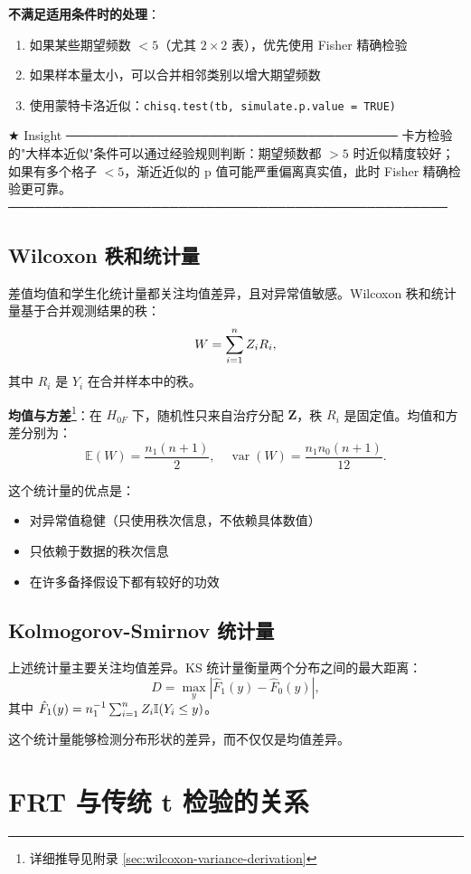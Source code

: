 \textbf{不满足适用条件时的处理}：

\begin{enumerate}
  \item 如果某些期望频数 $< 5$（尤其 $2 \times 2$ 表），优先使用 Fisher 精确检验
  \item 如果样本量太小，可以合并相邻类别以增大期望频数
  \item 使用蒙特卡洛近似：\texttt{chisq.test(tb, simulate.p.value = TRUE)}
\end{enumerate}

★ Insight ─────────────────────────────────────
卡方检验的"大样本近似"条件可以通过经验规则判断：期望频数都 $>5$ 时近似精度较好；如果有多个格子 $<5$，渐近近似的 p 值可能严重偏离真实值，此时 Fisher 精确检验更可靠。
─────────────────────────────────────────────────

\subsection{Wilcoxon 秩和统计量}

差值均值和学生化统计量都关注均值差异，且对异常值敏感。Wilcoxon 秩和统计量基于合并观测结果的秩：
\[
W = \sum_{i=1}^n Z_i R_i,
\]
其中 $R_i$ 是 $Y_i$ 在合并样本中的秩。

\textbf{均值与方差}\footnote{详细推导见附录 \cref{sec:wilcoxon-variance-derivation}}：在 $H_{0F}$ 下，随机性只来自治疗分配 $\mathbf{Z}$，秩 $R_i$ 是固定值。均值和方差分别为：
\[
\mathbb{E}(W) = \frac{n_1(n+1)}{2}, \quad \operatorname{var}(W) = \frac{n_1 n_0 (n+1)}{12}.
\]

这个统计量的优点是：
\begin{itemize}
  \item 对异常值稳健（只使用秩次信息，不依赖具体数值）
  \item 只依赖于数据的秩次信息
  \item 在许多备择假设下都有较好的功效
\end{itemize}

\subsection{Kolmogorov-Smirnov 统计量}

上述统计量主要关注均值差异。KS 统计量衡量两个分布之间的最大距离：
\[
D = \max_y |\hat{F}_1(y) - \hat{F}_0(y)|,
\]
其中 $\hat{F}_1(y) = n_1^{-1} \sum_{i=1}^n Z_i \mathbb{I}(Y_i \leq y)$。

这个统计量能够检测分布形状的差异，而不仅仅是均值差异。

\section{FRT 与传统 t 检验的关系}

